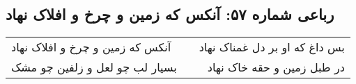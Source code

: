 \begin{center}
\section*{رباعی شماره ۵۷: آنکس که زمین و چرخ و افلاک نهاد}
\label{sec:sh057}
\begin{longtable}{l p{0.5cm} r}
آنکس که زمین و چرخ و افلاک نهاد
&&
بس داغ که او بر دل غمناک نهاد
\\
بسیار لب چو لعل و زلفین چو مشک
&&
در طبل زمین و حقه خاک نهاد
\\
\end{longtable}
\end{center}
